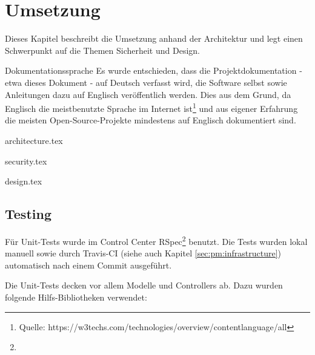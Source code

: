 \begin{comment}
(Implementierung) Architektur und Design beschrieben: Mit begründeten Architekturentscheidungen, mit Diskussion, wie Qualitätsattribute sichergestellt wurden (welche Qualität wurde erreicht?), mit Dokumentation, welche Experimente/Tests durchgeführt wurden und welche Lösungsoptionen aufgrund der Ergebnisse dieser Experimente/Tests
verworfen wurden (was ging schief?)
\end{comment}

\chapter{Umsetzung}
Dieses Kapitel beschreibt die Umsetzung anhand der Architektur und legt einen Schwerpunkt auf die Themen Sicherheit und Design.

\begin{decision}{Dokumentationssprache}
Es wurde entschieden, dass die Projektdokumentation - etwa dieses Dokument - auf Deutsch verfasst wird, die Software selbst sowie Anleitungen dazu auf Englisch veröffentlich werden. Dies aus dem Grund, da Englisch die meistbenutzte Sprache im Internet ist\footnote{Quelle: https://w3techs.com/technologies/overview/content\textunderscore language/all} und aus eigener Erfahrung die meisten Open-Source-Projekte mindestens auf Englisch dokumentiert sind.

\end{decision}


{architecture.tex}

\clearpage
{security.tex}

\clearpage
{design.tex}

\clearpage
\section{Testing}


Für Unit-Tests wurde im Control Center RSpec\footnote{} benutzt. Die Tests wurden lokal manuell sowie durch Travis-CI (siehe auch Kapitel \ref{sec:pm:infrastructure}) automatisch nach einem Commit ausgeführt.

Die Unit-Tests decken vor allem Modelle und Controllers ab. Dazu wurden folgende Hilfs-Bibliotheken verwendet:

